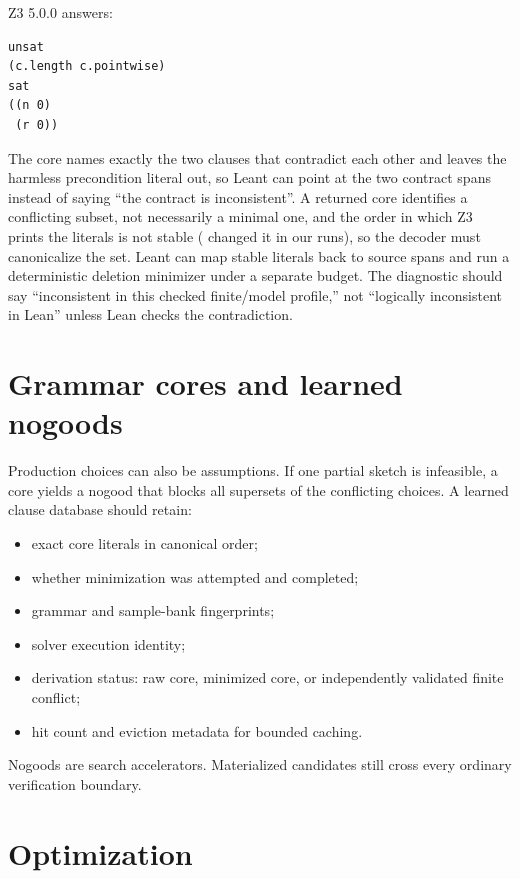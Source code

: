\documentclass[10pt,letterpaper,oneside]{report}
\newcommand{\code}[1]{\texttt{\detokenize{#1}}}
\begin{document}
Z3 5.0.0 answers:

\begin{lstlisting}[language=SMTLib]
unsat
(c.length c.pointwise)
sat
((n 0)
 (r 0))
\end{lstlisting}

The core names exactly the two clauses that contradict each other and leaves the harmless precondition literal \code{c.pre} out, so Leant can point at the two contract spans instead of saying ``the contract is inconsistent''. A returned core identifies a conflicting subset, not necessarily a minimal one, and the order in which Z3 prints the literals is not stable (\code{smt.core.minimize} changed it in our runs), so the decoder must canonicalize the set. Leant can map stable literals back to source spans and run a deterministic deletion minimizer under a separate budget. The diagnostic should say ``inconsistent in this checked finite/model profile,'' not ``logically inconsistent in Lean'' unless Lean checks the contradiction.

\section{Grammar cores and learned nogoods}

Production choices can also be assumptions. If one partial sketch is infeasible, a core yields a nogood that blocks all supersets of the conflicting choices. A learned clause database should retain:

\begin{itemize}
\item exact core literals in canonical order;
\item whether minimization was attempted and completed;
\item grammar and sample-bank fingerprints;
\item solver execution identity;
\item derivation status: raw core, minimized core, or independently validated finite conflict;
\item hit count and eviction metadata for bounded caching.
\end{itemize}

Nogoods are search accelerators. Materialized candidates still cross every ordinary verification boundary.

\section{Optimization}
\end{document}
